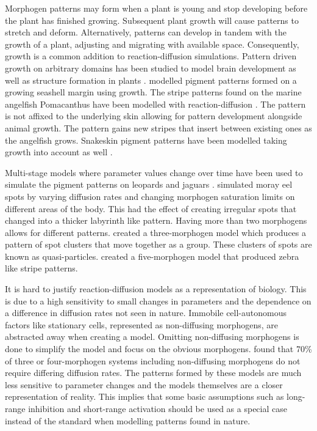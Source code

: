 Morphogen patterns may form when a plant is young and stop developing before the plant has finished growing. Subsequent plant growth will cause patterns to stretch and deform. Alternatively, patterns can develop in tandem with the growth of a plant, adjusting and migrating with available space. Consequently, growth is a common addition to reaction-diffusion simulations. Pattern driven growth on arbitrary domains has been studied to model brain development \citep{lefevre2010} as well as structure formation in plants \citep{harrison2002, holloway2007}. \citet{fowler1992} modelled pigment patterns formed on a growing seashell margin using growth. The stripe patterns found on the marine angelfish Pomacanthus have been modelled with reaction-diffusion \citep{kondo1995}. The pattern is not affixed to the underlying skin allowing for pattern development alongside animal growth. The pattern gains new stripes that insert between existing ones as the angelfish grows. Snakeskin pigment patterns have been modelled taking growth into account as well \citep{murray1991}.

Multi-stage models where parameter values change over time have been used to simulate the pigment patterns on leopards and jaguars \citep{liu2006}. \citet{malheiros2017} simulated moray eel spots by varying diffusion rates and changing morphogen saturation limits on different areas of the body. This had the effect of creating irregular spots that changed into a thicker labyrinth like pattern. Having more than two morphogens allows for different patterns. \citet{schenk2000} created a three-morphogen model which produces a pattern of spot clusters that move together as a group. These clusters of spots are known as quasi-particles. \citet{meinhardt1982} created a five-morphogen model that produced zebra like stripe patterns.

It is hard to justify reaction-diffusion models as a representation of biology. This is due to a high sensitivity to small changes in parameters and the dependence on a difference in diffusion rates not seen in nature. Immobile cell-autonomous factors like stationary cells, represented as non-diffusing morphogens, are abstracted away when creating a model. Omitting non-diffusing morphogens is done to simplify the model and focus on the obvious morphogens. \citet{marcon2016} found that 70\% of three or four-morphogen systems including non-diffusing morphogens do not require differing diffusion rates. The patterns formed by these models are much less sensitive to parameter changes and the models themselves are a closer representation of reality. This implies that some basic assumptions such as long-range inhibition and short-range activation should be used as a special case instead of the standard when modelling patterns found in nature.

